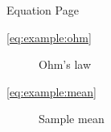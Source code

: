 \vskip 0.25cm
\baselineskip=1pc
\lineskip=1pc
\lineskiplimit=1pc
\noindent Equation \hfill Page \par
\begin{description}
  \item[\ref{eq:example:ohm}] Ohm's law \dotfill \pageref{eq:example:ohm}
  \item[\ref{eq:example:mean}] Sample mean \dotfill \pageref{eq:example:mean}
\end{description}
